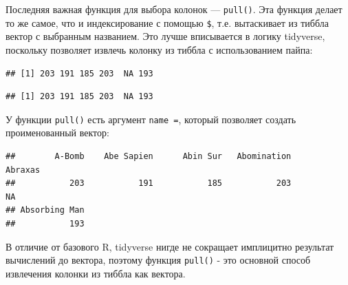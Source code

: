 \documentclass[
]{book}
\newenvironment{Shaded}{\begin{snugshade}}{\end{snugshade}}
\newcommand{\KeywordTok}[1]{\textcolor[rgb]{0.13,0.29,0.53}{\textbf{#1}}}
\newcommand{\NormalTok}[1]{#1}
\newcommand{\OperatorTok}[1]{\textcolor[rgb]{0.81,0.36,0.00}{\textbf{#1}}}
\newcommand{\StringTok}[1]{\textcolor[rgb]{0.31,0.60,0.02}{#1}}
\begin{document}
Последняя важная функция для выбора колонок --- \texttt{pull()}. Эта функция делает то же самое, что и индексирование с помощью \texttt{\$}, т.е. вытаскивает из тиббла вектор с выбранным названием. Это лучше вписывается в логику tidyverse, поскольку позволяет извлечь колонку из тиббла с использованием пайпа:

\begin{Shaded}
\end{Shaded}

\begin{verbatim}
## [1] 203 191 185 203  NA 193
\end{verbatim}

\begin{Shaded}
\end{Shaded}

\begin{verbatim}
## [1] 203 191 185 203  NA 193
\end{verbatim}

У функции \texttt{pull()} есть аргумент \texttt{name\ =}, который позволяет создать проименованный вектор:

\begin{Shaded}
\end{Shaded}

\begin{verbatim}
##        A-Bomb    Abe Sapien      Abin Sur   Abomination       Abraxas 
##           203           191           185           203            NA 
## Absorbing Man 
##           193
\end{verbatim}

В отличие от базового R, tidyverse нигде не сокращает имплицитно результат вычислений до вектора, поэтому функция \texttt{pull()} - это основной способ извлечения колонки из тиббла как вектора.
\end{document}
